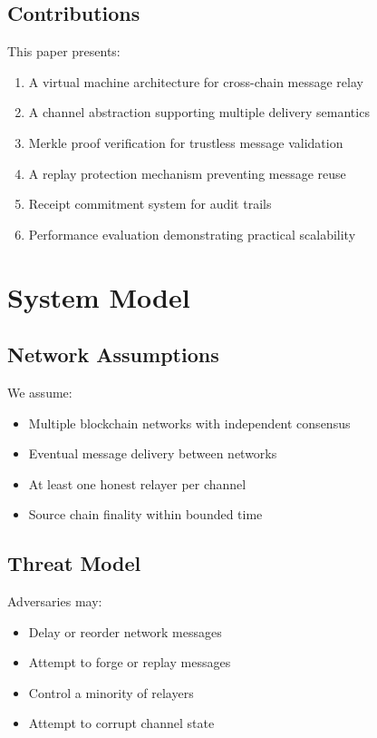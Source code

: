 \documentclass[11pt,twocolumn]{article}
\begin{document}
\subsection{Contributions}

This paper presents:

\begin{enumerate}
\item A virtual machine architecture for cross-chain message relay
\item A channel abstraction supporting multiple delivery semantics
\item Merkle proof verification for trustless message validation
\item A replay protection mechanism preventing message reuse
\item Receipt commitment system for audit trails
\item Performance evaluation demonstrating practical scalability
\end{enumerate}

\section{System Model}

\subsection{Network Assumptions}

We assume:
\begin{itemize}
\item Multiple blockchain networks with independent consensus
\item Eventual message delivery between networks
\item At least one honest relayer per channel
\item Source chain finality within bounded time
\end{itemize}

\subsection{Threat Model}

Adversaries may:
\begin{itemize}
\item Delay or reorder network messages
\item Attempt to forge or replay messages
\item Control a minority of relayers
\item Attempt to corrupt channel state
\end{itemize}
\end{document}
